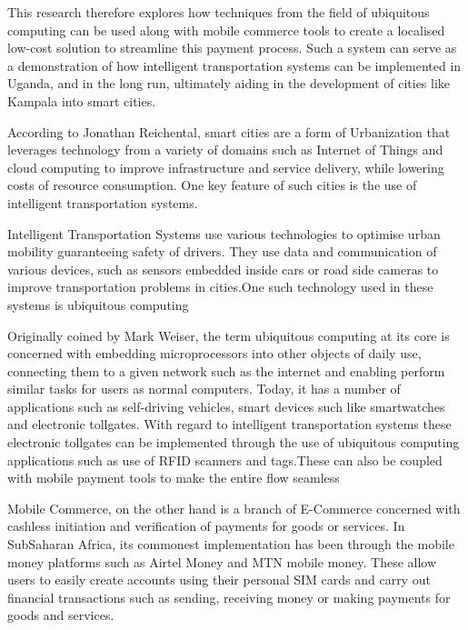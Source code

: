     This research therefore explores how techniques from the field of ubiquitous computing can be used along with mobile commerce tools to create a localised low-cost solution to streamline this payment process. Such a system can serve as a demonstration of how intelligent transportation systems can be implemented in Uganda, and in the long run, ultimately aiding in the development of cities like Kampala into smart cities.

    According to Jonathan Reichental, smart cities are a form of Urbanization that leverages technology from a variety of domains such as Internet of Things and cloud computing to improve infrastructure and service delivery, while lowering costs of resource consumption\cite{geng_strategic_2016}. One key feature of such cities is the use of intelligent transportation systems.


    Intelligent Transportation Systems use various technologies to optimise urban mobility guaranteeing safety of drivers\cite{i_meneguette_intelligent_2018}. They use data and communication of various devices, such as sensors embedded inside cars or road side cameras to improve transportation problems in cities.One such technology used in these systems is ubiquitous computing

    Originally coined by Mark Weiser\cite{weiser_hot_1993}, the term ubiquitous computing at its core is concerned with embedding microprocessors into other objects of daily use, connecting them to a given network such as the internet and enabling perform similar tasks for users as normal computers\cite{judith_ubiquitous_2009}. Today, it has a number of applications such as self-driving vehicles, smart devices such like smartwatches and electronic tollgates. With regard to intelligent transportation systems these electronic tollgates can be implemented through the use of ubiquitous computing applications such as use of RFID scanners and tags.These can also be coupled with mobile payment tools to make the entire flow seamless

    Mobile Commerce, on the other hand is a branch of E-Commerce concerned with cashless initiation and verification of payments for goods or services\cite{centellegher_mobile_2018}. In SubSaharan Africa, its commonest implementation has been through the mobile money platforms such as Airtel Money and MTN mobile money. These allow users to easily create accounts using their personal SIM cards and carry out financial transactions such as sending, receiving money or making payments for goods and services\cite{baah_state_2021}.

    \clearpage